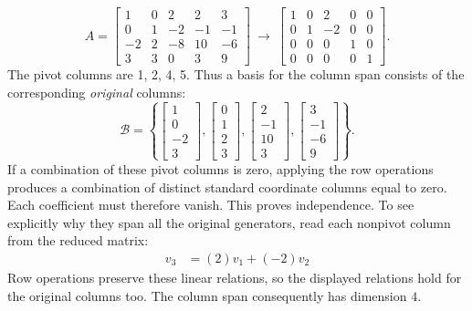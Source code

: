 \[A=\left[\begin{array}{rrrrr}1&0&2&2&3\\0&1&-2&-1&-1\\-2&2&-8&10&-6\\3&3&0&3&9\end{array}\right]\ \longrightarrow\ \left[\begin{array}{rrrrr}1&0&2&0&0\\0&1&-2&0&0\\0&0&0&1&0\\0&0&0&0&1\end{array}\right].\]
The pivot columns are 1, 2, 4, 5. Thus a basis for the column span consists of the corresponding \emph{original} columns:
\[\mathcal B=\left\{\left[\begin{array}{r}1\\0\\-2\\3\end{array}\right],\left[\begin{array}{r}0\\1\\2\\3\end{array}\right],\left[\begin{array}{r}2\\-1\\10\\3\end{array}\right],\left[\begin{array}{r}3\\-1\\-6\\9\end{array}\right]\right\}.\]
If a combination of these pivot columns is zero, applying the row operations produces a combination of distinct standard coordinate columns equal to zero. Each coefficient must therefore vanish. This proves independence. To see explicitly why they span all the original generators, read each nonpivot column from the reduced matrix:
\[\begin{aligned}v_{3}&=(2)v_{1}+(-2)v_{2}\end{aligned}\]
Row operations preserve these linear relations, so the displayed relations hold for the original columns too. The column span consequently has dimension $4$.


